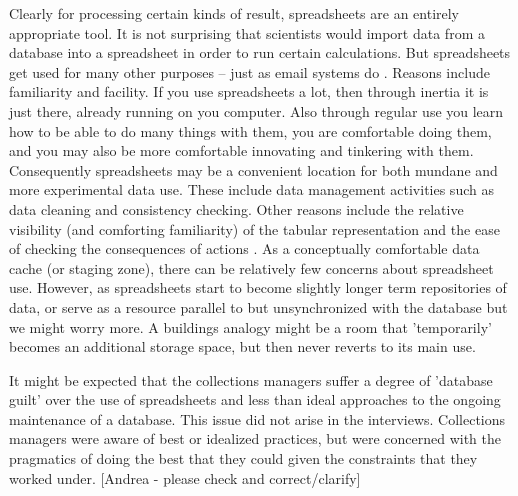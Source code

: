 Clearly for processing certain kinds of result, spreadsheets are an entirely appropriate tool. It is not surprising that scientists would import data from a database into a spreadsheet in order to run certain calculations. But spreadsheets get used for many other purposes – just as email systems do \cite{bellotti2005quality}. Reasons include familiarity and facility. If you use spreadsheets a lot, then through inertia it is just there, already running on you computer. Also through regular use you learn how to be able to do many things with them, you are comfortable doing them, and you may also be more comfortable innovating and tinkering with them.  Consequently spreadsheets may be a convenient location for both mundane and more experimental data use. These include data management activities such as data cleaning and consistency checking.  Other reasons include the relative visibility (and comforting familiarity) of the tabular representation and the ease of checking the consequences of actions \cite{nardi1991twinkling}. As a conceptually comfortable data cache (or staging zone), there can be relatively few concerns about spreadsheet use. However, as spreadsheets start to become slightly longer term repositories of data, or serve as a resource parallel to but unsynchronized with the database but  we might worry more. A buildings analogy might be a room that 'temporarily' becomes an additional storage space, but then never reverts to its main use.

It might be expected that the collections managers suffer a degree of 'database guilt' over the use of spreadsheets and less than ideal approaches to the ongoing maintenance of a database. This issue did not arise in the interviews. Collections managers were aware of best or idealized practices, but were concerned with the pragmatics of doing the best that they could given the constraints that they worked under. [Andrea - please check and correct/clarify]

